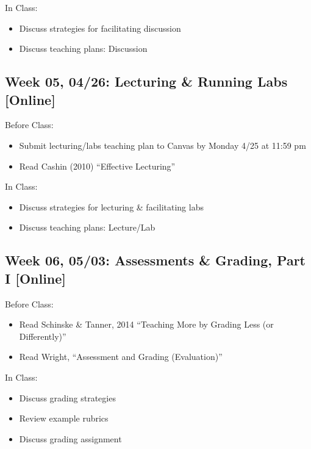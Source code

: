 \documentclass[11pt,]{article}
\providecommand{\tightlist}{%
  \setlength{\itemsep}{0pt}\setlength{\parskip}{0pt}}
\begin{document}
In Class:

\begin{itemize}
\tightlist
\item
  Discuss strategies for facilitating discussion
\item
  Discuss teaching plans: Discussion
\end{itemize}

\hypertarget{week-05-0426-lecturing-running-labs-online}{%
\subsection{Week 05, 04/26: Lecturing \& Running Labs
{[}Online{]}}\label{week-05-0426-lecturing-running-labs-online}}

Before Class:

\begin{itemize}
\tightlist
\item
  Submit lecturing/labs teaching plan to Canvas by Monday 4/25 at 11:59
  pm
\item
  Read Cashin (2010) ``Effective Lecturing''
\end{itemize}

In Class:

\begin{itemize}
\tightlist
\item
  Discuss strategies for lecturing \& facilitating labs
\item
  Discuss teaching plans: Lecture/Lab
\end{itemize}

\hypertarget{week-06-0503-assessments-grading-part-i-online}{%
\subsection{Week 06, 05/03: Assessments \& Grading, Part I
{[}Online{]}}\label{week-06-0503-assessments-grading-part-i-online}}

Before Class:

\begin{itemize}
\tightlist
\item
  Read Schinske \& Tanner, 2014 ``Teaching More by Grading Less (or
  Differently)''
\item
  Read Wright, ``Assessment and Grading (Evaluation)''
\end{itemize}

In Class:

\begin{itemize}
\tightlist
\item
  Discuss grading strategies
\item
  Review example rubrics
\item
  Discuss grading assignment
\end{itemize}
\end{document}
